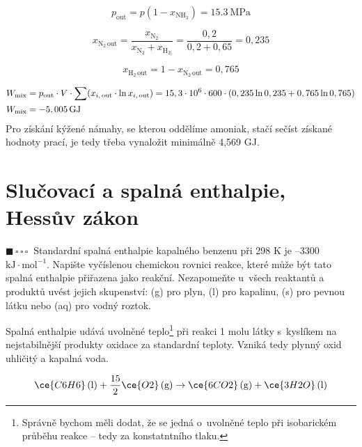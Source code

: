 \documentclass{book}
\newcommand{\jeden}{$\blacksquare \, \square \, \square \, \square \; \; $}
\renewenvironment{quotation}{\par}{\par} %
\begin{document}
\[
p_{\mathrm{out}}=p(1-x_{\mathrm{NH_{3}}})=\SI[output-decimal-marker = {,}]{15,3}{\mega\pascal}
\]

\[
x_{\mathrm{N_{2}\,out}}=\frac{x_{\mathrm{N_{2}}}}{x_{\mathrm{N_{2}}}+x_{\mathrm{H_{2|}}}}=\frac{0,2}{0,2+0,65}=0,235
\]

\[
x_{\mathrm{H_{2}\,out}}=1-x_{\mathrm{N_{2}\,out}}=0,765
\]

\begin{align*}
W_{\mathrm{mix}} & =p_{\mathrm{out}}\cdot\-V\cdot\sum(x_{i,\mathrm{\,out}}\cdot\-\ln x_{i,\mathrm{\,out}})=15,3\cdot10^{6}\cdot600\cdot(0,235\ln0,235+0,765\ln0,765)\\
W_{\mathrm{mix}} & =-5,005\,\mathrm{GJ}
\end{align*}
Pro získání kýžené námahy, se kterou oddělíme amoniak, stačí sečíst
získané hodnoty prací, je tedy třeba vynaložit minimálně 4,569 GJ.

\section{Slučovací a spalná enthalpie, Hessův zákon}

\begin{quotation}
\jeden Standardní spalná enthalpie kapalného benzenu při 298 K je --3300 $\mathrm{kJ\cdot mol^{-1}}$. Napište
vyčíslenou chemickou rovnici reakce, které může být tato spalná enthalpie
přiřazena jako reakční. Nezapomeňte u~všech reaktantů a produktů uvést
jejich skupenství: (g) pro plyn, (l) pro kapalinu, (s) pro pevnou
látku nebo (aq) pro vodný roztok.
\end{quotation} \dotfill \par 
Spalná enthalpie udává uvolněné teplo\footnote{Správně bychom měli dodat, že se jedná o~uvolněné teplo při isobarickém průběhu reakce -- tedy za konstatntního tlaku.} při reakci 1 molu látky s~kyslíkem na nejstabilnější produkty oxidace za standardní teploty. Vzniká tedy plynný oxid uhličitý a kapalná voda.

\[
\ce{C6H6}\,(\mathrm{l})+\frac{15}{2}\ce{O2}\,(\mathrm{g})\rightarrow\ce{6CO2}\,(\mathrm{g})+\ce{3H2O}\,(\mathrm{l})
\]
\end{document}

